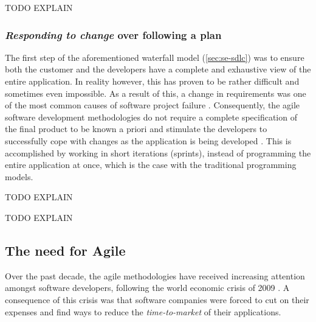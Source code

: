 TODO EXPLAIN

\subsubsection{\emph{Responding to change} over following a plan}
The first step of the aforementioned waterfall model (\autoref{sec:se-sdlc}) was to ensure both the customer and the developers have a complete and exhaustive view of the entire application. In reality however, this has proven to be rather difficult and sometimes even impossible. As a result of this, a change in requirements was one of the most common causes of software project failure \cite{glass2001agile}. Consequently, the agile software development methodologies do not require a complete specification of the final product to be known a priori and stimulate the developers to successfully cope with changes as the application is being developed \cite{Hazzan2014}. This is accomplished by working in short iterations (sprints), instead of programming the entire application at once, which is the case with the traditional programming models.

TODO EXPLAIN

TODO EXPLAIN


\subsection{The need for Agile}
Over the past decade, the agile methodologies have received increasing attention amongst software developers, following the world economic crisis of 2009 \cite{ionel2009}. A consequence of this crisis was that software companies were forced to cut on their expenses and find ways to reduce the \emph{time-to-market} of their applications.


